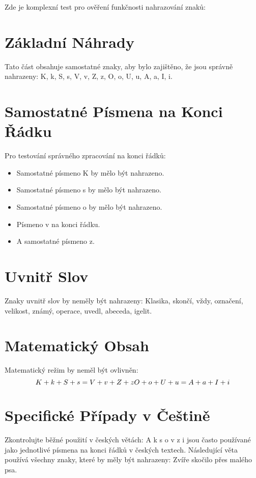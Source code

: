 \documentclass{article}
\begin{document}
Zde je komplexní test pro ověření funkčnosti nahrazování znaků:

\section*{Základní Náhrady}
Tato část obsahuje samostatné znaky, aby bylo zajištěno, že jsou správně nahrazeny:
K, k, S, s, V, v, Z, z, O, o, U, u, A, a, I, i.

\section*{Samostatné Písmena na Konci Řádku}
Pro testování správného zpracování na konci řádků:
\begin{itemize}
    \item Samostatné písmeno K by mělo být nahrazeno. \\
    \item Samostatné písmeno s by mělo být nahrazeno. \\
    \item Samostatné písmeno o by mělo být nahrazeno. \\
    \item Písmeno v na konci řádku.
    \item A samostatné písmeno z.
\end{itemize}

\section*{Uvnitř Slov}
Znaky uvnitř slov by neměly být nahrazeny:
Klasika, skončí, vždy, označení, velikost, známý, operace, uvedl, abeceda, igelit.

\section*{Matematický Obsah}
Matematický režim by neměl být ovlivněn:
\begin{equation}
    K + k + S + s = V + v + Z + z \\
    O + o + U + u = A + a + I + i
\end{equation}

\section*{Specifické Případy v Češtině}
Zkontrolujte běžné použití v českých větách:
A k s o v z i jsou často používané jako jednotlivé písmena na konci řádků v českých textech.
Následující věta používá všechny znaky, které by měly být nahrazeny: Zvíře skočilo přes malého psa.
\end{document}
